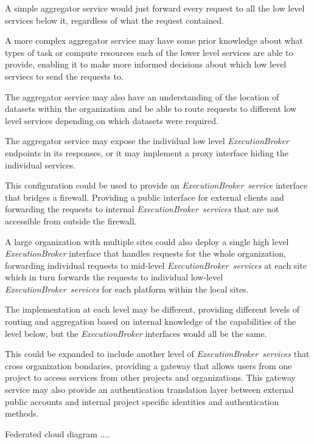 \documentclass[11pt,a4paper]{ivoa}
\newcommand{\execbrokerclass} {\textit{ExecutionBroker}}
\newcommand{\execbrokerservice}[1] {\textit{ExecutionBroker~service#1}}
\newcommand{\dataset}[1] {dataset#1}
\begin{document}
A simple aggregator service would just forward every request to all the low level services below it,
regardless of what the request contained.

A more complex aggregator service may have some prior knowledge about what types of task or compute resources
each of the lower level services are able to provide, enabling it to make more informed decisions about
which low level serviecs to send the requests to.

The aggregator service may also have an understanding of the location of \dataset{s} within the organization and
be able to route requests to different low level services depending on which \dataset{s} were required.

The aggregator service may expose the individual low level \execbrokerclass{} endpoints in its responses,
or it may implement a proxy interface hiding the individual services.

This configuration could be used to provide an \execbrokerservice{} interface
that bridges a firewall. Providing a public interface for external clients and forwarding the requests
to internal \execbrokerservice{s} that are not accessible from outside the
firewall.

A large organization with multiple sites could also deploy a single high level \execbrokerclass{}
interface that handles requests for the whole organization, forwarding individual requests to mid-level
\execbrokerservice{s} at each site which in turn forwards the requests to
individual low-level \execbrokerservice{s} for each platform within the local sites.

The implementation at each level may be different, providing different levels of routing
and aggregation based on internal knowledge of the capabilities of the level below,
but the \execbrokerclass{} interfaces would all be the same.

This could be expanded to include another level of \execbrokerservice{s} that
cross organization bondaries, providing a gateway that allows users from one project to access services
from other projects and organizations. This gateway service may also provide an authentication translation
layer between external public accounts and internal project specific identities and authentication methods.

Federated cloud diagram ....
\end{document}

